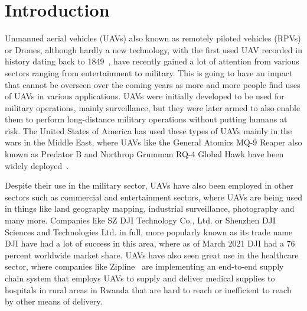


\chapter{Introduction}
\label{chap:thesis-introduction}

Unmanned aerial vehicles (UAVs) also known as remotely piloted vehicles (RPVs) or Drones, although hardly a new technology, with the first used UAV recorded in history dating back to 1849~\cite{vasileprisacariujdrm2017}, have recently gained a lot of attention from various sectors ranging from entertainment to military. This is going to have an impact that cannot be overseen over the coming years as more and more people find uses of UAVs in various applications. UAVs were initially developed to be used for military operations, mainly surveillance, but they were later armed to also enable them to perform long-distance military operations without putting humans at risk. The United States of America has used these types of UAVs mainly in the wars in the Middle East, where UAVs like the General Atomics MQ-9 Reaper also known as Predator B and Northrop Grumman RQ-4 Global Hawk have been widely deployed~\cite{samaanorientxxi2022}.

Despite their use in the military sector, UAVs have also been employed in other sectors such as commercial and entertainment sectors, where UAVs are being used in things like land geography mapping, industrial surveillance, photography and many more. Companies like SZ DJI Technology Co., Ltd. or Shenzhen DJI Sciences and Technologies Ltd. in full, more popularly known as its trade name DJI have had a lot of success in this area, where as of March 2021 DJI had a 76 percent worldwide market share\cite{djimarketshare2021}. UAVs have also seen great use in the healthcare sector, where companies like Zipline~\cite{droneslevy2022} are implementing an end-to-end supply chain system that employs UAVs to supply and deliver medical supplies to hospitals in rural areas in Rwanda that are hard to reach or inefficient to reach by other means of delivery.

